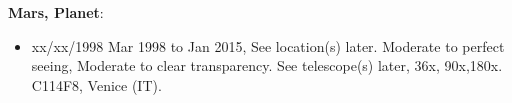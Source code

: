 {\bf Mars, Planet}:
\begin{itemize}
\item xx/xx/1998 Mar 1998 to Jan 2015, See location(s) later. Moderate to perfect seeing, Moderate to clear transparency. See telescope(s) later, 36x, 90x,180x. C114F8, Venice (IT).
\end{itemize}
